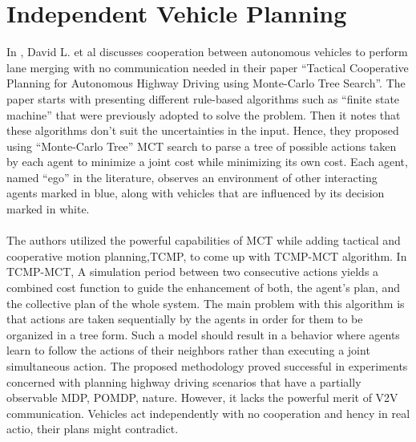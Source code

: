 \section{Independent Vehicle Planning}
\label{independent_learner}
In \cite{paper9}, David L. et al discusses cooperation between autonomous vehicles to perform lane merging with no communication needed in their paper “Tactical Cooperative Planning for Autonomous Highway Driving using Monte-Carlo Tree Search”. The paper starts with presenting different rule-based algorithms such as “finite state machine” that were previously adopted to solve the problem. Then it notes that these algorithms don’t suit the uncertainties in the input.  Hence, they proposed using “Monte-Carlo Tree” MCT search to parse a tree of possible actions taken by each agent to minimize a joint cost while minimizing its own cost. Each agent, named “ego” in the literature, observes an environment of other interacting agents marked in blue, along with vehicles that are influenced by its decision marked in white.
\\ \\
The authors utilized the powerful capabilities of MCT while adding tactical and cooperative motion planning,TCMP, to come up with TCMP-MCT algorithm. In TCMP-MCT, A simulation period between two consecutive actions yields a combined cost function to guide the enhancement of both, the agent’s plan, and the collective plan of the whole system. The main problem with this algorithm is that actions are taken sequentially by the agents in order for them to be organized in a tree form. Such a model should result in a behavior where agents learn to follow the actions of their neighbors rather than executing a joint simultaneous action.
The proposed methodology proved successful in experiments concerned with planning highway driving scenarios that have a partially observable MDP, POMDP, nature. However, it lacks the powerful merit of V2V communication. Vehicles act independently with no cooperation and hency in real actio, their plans might contradict.


